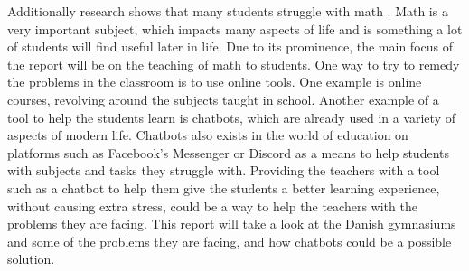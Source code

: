 \newline\newline
Additionally research shows that many students struggle with math \cite{MathTeens}. Math is a very important subject, which impacts many aspects of life and is something a lot of students will find useful later in life. Due to its prominence, the main focus of the report will be on the teaching of math to students.
\newline\newline
One way to try to remedy the problems in the classroom is to use online tools. One example is online courses, revolving around the subjects taught in school. Another example of a tool to help the students learn is chatbots, which are already used in a variety of aspects of modern life. Chatbots also exists in the world of education on platforms such as Facebook's Messenger \cite{Messenger} or Discord \cite{DiscordDownloads} as a means to help students with subjects and tasks they struggle with. 
\newline\indent
Providing the teachers with a tool such as a chatbot to help them give the students a better learning experience, without causing extra stress, could be a way to help the teachers with the problems they are facing. This report will take a look at the Danish gymnasiums and some of the problems they are facing, and how chatbots could be a possible solution. 



